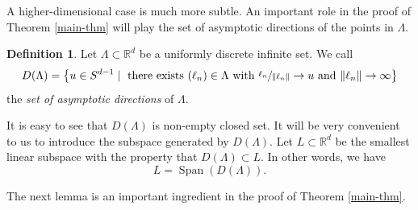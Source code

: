 \documentclass[10pt]{amsart}
\DeclareMathOperator{\Span}{Span}
\let\ra\rightarrow
\newcommand{\bR}{\mathbb{R}}
\newcounter{dummy} \numberwithin{dummy}{section}
\theoremstyle{plain}
\theoremstyle{definition}
\newtheorem{mydef}[dummy]{Definition}
\begin{document}
A higher-dimensional case is much more subtle.
An important role in the proof of Theorem \ref{main-thm} will play the set of asymptotic directions of the points in $\Lambda$.
\begin{mydef}
Let $\Lambda \subset \bR^d$ be a uniformly discrete infinite set. We call
\[
D(\Lambda) = \bigl\{ u \in S^{d-1} \mid \text{ there exists } (\ell_n) \in \Lambda \text{ with } \sfrac{\ell_n}{\| \ell_n \|} \ra u \text{ and } \Vert \ell_n \Vert \ra \infty\bigr\}
\]
the \textit{set of asymptotic directions} of $\Lambda$.
\end{mydef}

It is easy to see that $D(\Lambda)$ is non-empty closed set. It will be very convenient to us to introduce the subspace generated by $D(\Lambda)$. Let $L \subset \bR^d$ be the smallest linear subspace with the property that $D(\Lambda) \subset L$. In other words, we have
\[
L = \Span(D(\Lambda)).
\]

The next lemma is an important ingredient in the proof of Theorem \ref{main-thm}.
\end{document}
